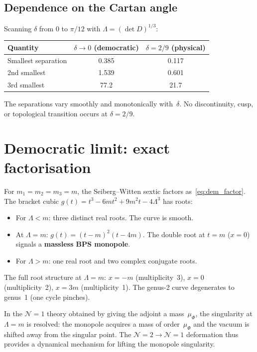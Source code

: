 \documentclass[aps,prd,twocolumn,showpacs,preprintnumbers,superscriptaddress,floatfix]{revtex4-2}
\begin{document}
\subsection{Dependence on the Cartan angle}

Scanning $\delta$ from $0$ to $\pi/12$ with
$\Lambda = (\det D)^{1/3}$:

\begin{center}
\small
\begin{tabular}{lcc}
\toprule
Quantity & $\delta \to 0$ (democratic) & $\delta = 2/9$ (physical) \\
\midrule
Smallest separation & 0.385 & 0.117 \\
2nd smallest & 1.539 & 0.601 \\
3rd smallest & 77.2 & 21.7 \\
\bottomrule
\end{tabular}
\end{center}

The separations vary smoothly and monotonically with~$\delta$.
No discontinuity, cusp, or topological transition occurs at
$\delta = 2/9$.


\section{Democratic limit: exact factorisation}
\label{app:democratic}

For $m_1 = m_2 = m_3 = m$, the Seiberg--Witten sextic
factors as~\eqref{eq:dem_factor}.
The bracket cubic
$g(t) = t^3 - 6mt^2 + 9m^2t - 4\Lambda^3$
has roots:

\begin{itemize}
  \item For $\Lambda < m$: three distinct real roots.
    The curve is smooth.
  \item At $\Lambda = m$:
    $g(t) = (t - m)^2(t - 4m)$.
    The double root at $t = m$ ($x = 0$) signals a
    \textbf{massless BPS monopole}.
  \item For $\Lambda > m$: one real root and two complex conjugate
    roots.
\end{itemize}

The full root structure at $\Lambda = m$:
$x = -m$ (multiplicity~3), $x = 0$ (multiplicity~2),
$x = 3m$ (multiplicity~1).
The genus-2 curve degenerates to genus~1 (one cycle pinches).

In the $\mathcal{N}{=}1$ theory obtained by giving the adjoint
a mass~$\mu_\Phi$, the singularity at $\Lambda = m$ is
resolved: the monopole acquires a mass of order~$\mu_\Phi$ and
the vacuum is shifted away from the singular point.
The $\mathcal{N}{=}2 \to \mathcal{N}{=}1$ deformation thus
provides a dynamical mechanism for lifting the monopole singularity.
\end{document}

